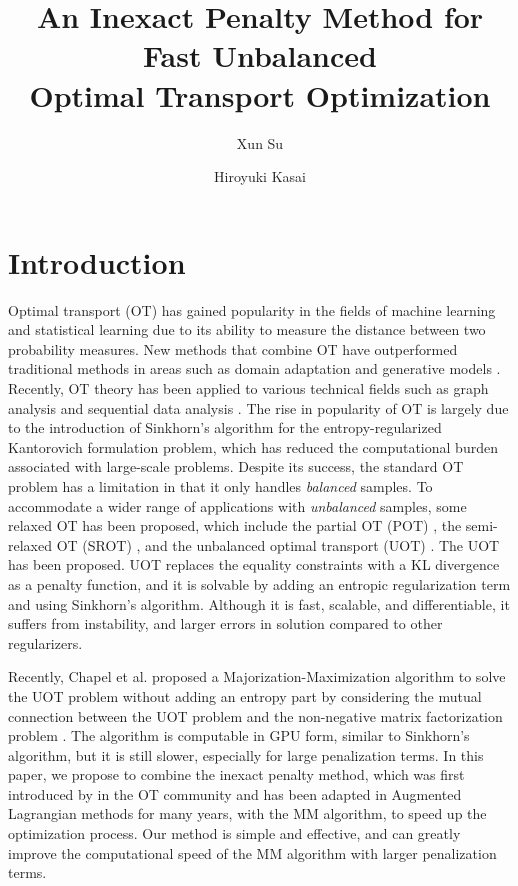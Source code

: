 \documentclass[a4paper,twocolumn]{article}
\title{An Inexact Penalty Method for Fast Unbalanced \protect\\ Optimal Transport Optimization}
\author{%
Xun Su\first
\and
Hiroyuki Kasai\second
}
\begin{document}
\maketitle

\section{Introduction}
\label{sec:int}

Optimal transport (OT) has gained popularity in the fields of machine learning and statistical learning due to its ability to measure the distance between two probability measures. New methods that combine OT have outperformed traditional methods in areas such as domain adaptation \cite{Courty_PAMI_2017} and generative models \cite{arjovsky2017wasserstein}. Recently, OT theory has been applied to various technical fields such as graph analysis \cite{Huang_SigPro_2020,Huang_ICASSP_2021,Fang_AAAI_2023} and sequential data analysis \cite{Horie_EUSIPCO_2022}. The rise in popularity of OT is largely due to the introduction of Sinkhorn's algorithm \cite{Cuturi_NIPS_2013} for the entropy-regularized Kantorovich formulation problem, which has reduced the computational burden associated with large-scale problems. Despite its success, the standard OT problem has a limitation in that it only handles {\it balanced} samples. To accommodate a wider range of applications with {\it unbalanced} samples, some relaxed OT has been proposed, which include the partial OT (POT) \cite{ferradans2013regularized}, the semi-relaxed OT (SROT) \cite{fukunaga_icassp2022,fukunaga_srsinkhorn}, and the unbalanced optimal transport (UOT) \cite{Caffarelli_AM_2010,chizat2017scaling}. The UOT has been proposed. UOT replaces the equality constraints with a KL divergence as a penalty function, and it is solvable by adding an entropic regularization term and using Sinkhorn's algorithm. Although it is fast, scalable, and differentiable, it suffers from instability, and larger errors in solution compared to other regularizers.

Recently, Chapel et al. proposed a Majorization-Maximization algorithm to solve the UOT problem without adding an entropy part by considering the mutual connection between the UOT problem and the non-negative matrix factorization problem \cite{Chapel_NeurIPS_2021}. The algorithm is computable in GPU form, similar to Sinkhorn's algorithm, but it is still slower, especially for large penalization terms. In this paper, we propose to combine the inexact penalty method, which was first introduced by \cite{pmlr-v115-xie20b} in the OT community and has been adapted in Augmented Lagrangian methods for many years, with the MM algorithm, to speed up the optimization process. Our method is simple and effective, and can greatly improve the computational speed of the MM algorithm with larger penalization terms.
\end{document}
